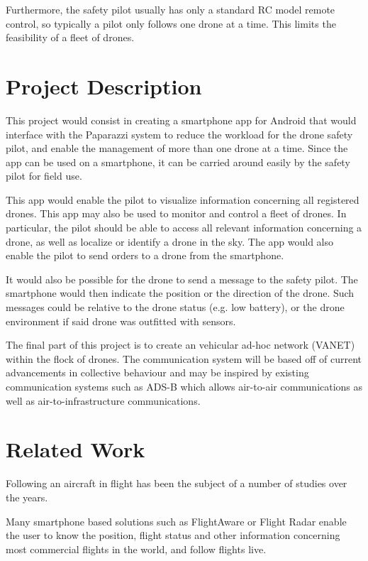 \documentclass[10pt,letterpaper]{article}
\begin{document}
Furthermore, the safety pilot usually has only a standard RC model remote control, so typically a pilot only follows one drone at a time. This limits the feasibility of a fleet of drones. 

\section{Project Description}
This project would consist in creating a smartphone app for Android that would interface with the Paparazzi system to reduce the workload for the drone safety pilot, and enable the management of more than one drone at a time. Since the app can be used on a smartphone, it can be carried around easily by the safety pilot for field use. 

This app would enable the pilot to visualize information concerning all registered drones. This app may also be used to monitor and control a fleet of drones. In particular, the pilot should be able to access all relevant information concerning a drone, as well as localize or identify a drone in the sky. The app would also enable the pilot to send orders to a drone from the smartphone. 

It would also be possible for the drone to send a message to the safety pilot. The smartphone would then indicate the position or the direction of the drone. Such messages could be relative to the drone status (e.g. low battery), or the drone environment if said drone was outfitted with sensors. 

The final part of this project is to create an vehicular ad-hoc network (VANET) within the flock of drones. The communication system will be based off of current advancements in collective behaviour and may be inspired by existing communication systems such as ADS-B \cite{faaAdsbServices, faaAdsbArchitecture} which allows air-to-air communications as well as air-to-infrastructure communications. 

\section{Related Work}
Following an aircraft in flight has been the subject of a number of studies over the years. 

Many smartphone based solutions such as FlightAware \cite{FlightAware} or Flight Radar \cite{FlightRadar24} enable the user to know the position, flight status and other information concerning most commercial flights in the world, and follow flights live. 
\end{document}
